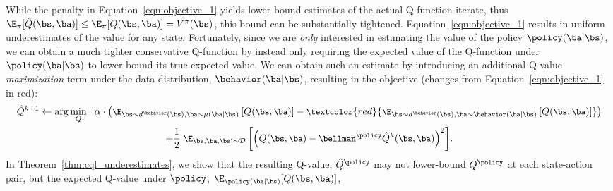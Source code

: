 While the penalty in Equation~\ref{eqn:objective_1} yields lower-bound estimates of the actual Q-function iterate, thus  
$\E_{\pi}[\hat{Q}(\bs, \ba)] \leq \E_{\pi}[Q(\bs, \ba) ] = V^\pi(\bs)$, 
this bound can be substantially tightened. Equation~\ref{eqn:objective_1} results in uniform underestimates of the value for any state.
Fortunately, since we are \textit{only} interested in estimating the value of the policy $\policy(\ba|\bs)$, we can obtain a much tighter conservative Q-function by instead only requiring the expected value of the Q-function under $\policy(\ba|\bs)$ to lower-bound its true expected value. We can obtain such an estimate by introducing an additional Q-value \textit{maximization} term under the data distribution, $\behavior(\ba|\bs)$, resulting in the objective (changes from Equation~\ref{eqn:objective_1} in red):
\begin{multline}
    \small{\hat{Q}^{k+1} \leftarrow \arg\min_{Q}~~ \alpha \cdot \left(\E_{\bs \sim d^\behavior(\bs), \ba \sim \mu(\ba|\bs)}\left[Q(\bs, \ba)\right] - \textcolor{red}{\E_{\bs \sim d^\behavior(\bs), \ba \sim \behavior(\ba|\bs)}\left[Q(\bs, \ba)\right]} \right)} \\
    \small{+ \frac{1}{2}~ \E_{\bs, \ba, \bs' \sim \mathcal{D}}\left[\left(Q(\bs, \ba) - \bellman^\policy \hat{Q}^{k} (\bs, \ba) \right)^2 \right]}.
    \label{eqn:modified_policy_eval}
\end{multline}
In Theorem~\ref{thm:cql_underestimates}, we show that the resulting Q-value, 
$\hat{Q}^{\policy}$ may not lower-bound ${Q}^\policy$ at each state-action pair, but the expected Q-value under $\policy$, $\E_{\policy(\ba|\bs)}[Q(\bs, \ba)]$,
